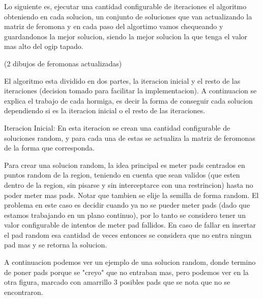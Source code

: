Lo siguiente es, ejecutar una cantidad configurable de iteraciones el algoritmo obteniendo en cada solucion, un conjunto de soluciones que van actualizando la matriz de feromona y en cada paso del algortimo vamos chequeando y guardandonos la mejor solucion, siendo la mejor solucion la que tenga el valor mas alto del ogip tapado.

(2 dibujos de feromonas actualizadas)

El algoritmo esta dividido en dos partes, la iteracion inicial y el resto de las iteraciones (decision tomado para facilitar la implementacion). A continuacion se explica el trabajo de cada hormiga, es decir la forma de conseguir cada solucion dependiendo si es la iteracion inicial o el resto de las iteraciones.

Iteracion Inicial: En esta iteracion se crean una cantidad configurable de soluciones random, y para cada una de estas se actualiza la matriz de feromonas de la forma que corresponda. 

Para crear una solucion random, la idea principal es meter pads centrados en puntos random de la region, teniendo en cuenta que sean validos (que esten dentro de la region, sin pisarse y sin interceptarce con una restrincion) hasta no poder meter mas pads. Notar que tambien se elije la semilla de forma random. El problema en este caso es decidir cuando ya no se pueder meter pads (dado que estamos trabajando en un plano continuo), por lo tanto se considero tener un valor configurable de intentos de meter pad fallidos. En caso de fallar en insertar el pad random esa cantidad de veces entonces se considera que no entra ningun pad mas y se retorna la solucion. 

A continuacion podemos ver un ejemplo de una solucion random, donde termino de poner pads porque se "creyo" que no entraban mas, pero podemos ver en la otra figura, marcado con amarrillo 3 posibles pads que se nota que no se encontraron.

